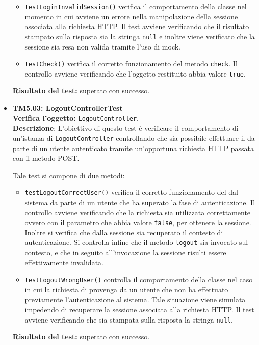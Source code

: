 \begin{itemize}
\begin{itemize}
\item \texttt{testLoginInvalidSession()} 
verifica il comportamento della classe nel momento in cui avviene un errore nella manipolazione della sessione associata alla richiesta HTTP. Il test avviene verificando che il risultato stampato sulla risposta sia la stringa \texttt{null} e inoltre viene verificato che la sessione sia resa non valida tramite l'uso di mock.

\item \texttt{testCheck()} verifica il corretto funzionamento del metodo \texttt{check}. Il controllo avviene verificando che l'oggetto restituito abbia valore \texttt{true}.

\end{itemize}
\textbf{Risultato del test:} superato con successo.


\item \textbf{TM5.03: LogoutControllerTest}\\
\textbf{Verifica l'oggetto:} \texttt{LogoutController}.\\
\textbf{Descrizione}: L'obiettivo di questo test è verificare il comportamento di un'istanza di \texttt{LogoutController} controllando che sia possibile effettuare il  da parte di un utente autenticato tramite un'opportuna richiesta HTTP passata con il metodo POST\@.

Tale test si compone di due metodi:

\begin{itemize}

\item \texttt{testLogoutCorrectUser()} verifica il corretto funzionamento del  dal sistema da parte di un utente che ha superato la fase di autenticazione. Il controllo avviene verificando che la richiesta sia utilizzata correttamente ovvero con il parametro che abbia valore \texttt{false}, per ottenere la sessione. Inoltre si verifica che dalla sessione sia recuperato il contesto di autenticazione. Si controlla infine che il metodo \texttt{logout} sia invocato sul contesto, e che in seguito all'invocazione la sessione risulti essere effettivamente invalidata.

\item \texttt{testLogoutWrongUser()}  controlla il comportamento della classe nel caso in cui la richiesta di  provenga da un utente che non ha effettuato previamente l'autenticazione al sistema. Tale situazione viene simulata impedendo di recuperare la sessione associata alla richiesta HTTP. Il test avviene verificando che sia stampata sulla risposta la stringa \texttt{null}.
\end{itemize}
\textbf{Risultato del test:} superato con successo.


\end{itemize}
